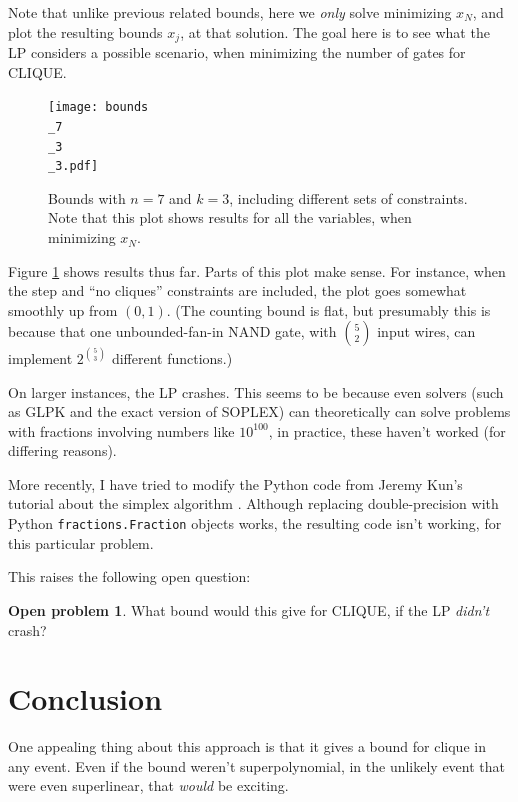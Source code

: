 \documentclass[12pt]{article}
\theoremstyle{definition}
\newtheorem{prob}{Open problem}[section]
\begin{document}
Note that unlike previous related bounds, here we {\em only} solve minimizing
$x_N$, and plot the resulting bounds $x_j$, at that solution. The
goal here is to see what the LP considers a possible scenario, when
minimizing the number of gates for CLIQUE.

\begin{figure}

\centering

\texttt{[image: bounds\\\_7\\\_3\\\_3.pdf]}

\caption{
Bounds with $n=7$ and $k=3$, including different sets of constraints.
Note that this plot shows results for all the variables, when
minimizing $x_N$.
}
\label{fig:bounds0}

\end{figure}

Figure \ref{fig:bounds0} shows results thus far.
Parts of this plot make sense. For instance, when the
step and ``no cliques'' constraints are included, the
plot goes somewhat smoothly up from $(0,1)$. (The counting
bound is flat, but presumably this is because
that one unbounded-fan-in NAND gate, with ${5 \choose 2}$
input wires, can implement $2^{5 \choose 3}$ different
functions.)

On larger instances, the LP crashes. This seems to be because even
solvers (such as GLPK and the exact version of SOPLEX) can
theoretically can solve problems with fractions involving
numbers like $10^{100}$, in practice, these haven't worked
(for differing reasons).

More recently, I have tried to modify the Python code from
Jeremy Kun's tutorial about the simplex algorithm \cite{kun_lp_simplex}.
Although replacing double-precision with Python {\tt fractions.Fraction}
objects works, the resulting code isn't working, for this particular
problem.

This raises the following open question:

\begin{prob}
What bound would this give for CLIQUE, if the LP {\em didn't} crash?
\end{prob}

\section{Conclusion}

One appealing thing about this approach is that it gives a
bound for clique in any event. Even if the bound weren't
superpolynomial, in the unlikely event that were even superlinear,
that {\em would} be exciting.
\end{document}
